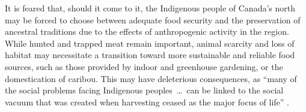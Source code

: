 \documentclass{report}
\begin{document}
\hspace{24pt}It is feared that, should it come to it, the Indigenous people of Canada's north may be forced to choose between adequate food security and the preservation of ancestral traditions due to the effects of anthropogenic activity in the region.
While hunted and trapped meat remain important, animal scarcity and loss of habitat may necessitate a transition toward more sustainable and reliable food sources, such as those provided by indoor and greenhouse gardening, or the domestication of caribou.
This may have deleterious consequences, as ``many of the social problems facing Indigenous peoples~\ldots~can be linked to the social vacuum that was created when harvesting ceased as the major focus of life'' \parencite[269]{socialculturalcapital}.

\clearpage

\printbibliography[heading=bibintoc]
\end{document}
